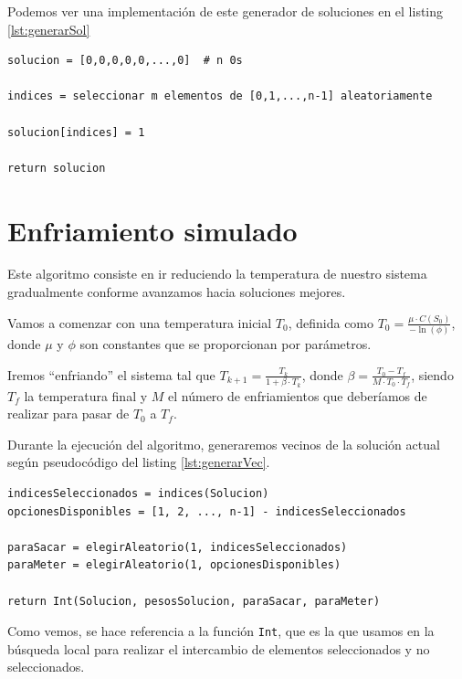 Podemos ver una implementación de este generador de soluciones en el listing \ref{lst:generarSol}

\begin{lstlisting}[frame=single, caption={Generador de soluciones}, captionpos=b, label=lst:generarSol]
solucion = [0,0,0,0,0,...,0]  # n 0s

indices = seleccionar m elementos de [0,1,...,n-1] aleatoriamente

solucion[indices] = 1

return solucion
\end{lstlisting}

\newpage

\section{Enfriamiento simulado}

Este algoritmo consiste en ir reduciendo la temperatura de nuestro sistema gradualmente conforme avanzamos hacia soluciones mejores.

Vamos a comenzar con una temperatura inicial $T_0$, definida como $\displaystyle T_0 = \frac{\mu \cdot C(S_0)}{-\ln(\phi)}$, donde $\mu$ y $\phi$ son constantes que se proporcionan por parámetros.

Iremos ``enfriando'' el sistema tal que $\displaystyle T_{k+1}= \frac{T_k}{1+ \beta \cdot T_k}$, donde $\displaystyle \beta = \frac{T_0 - T_f}{M\cdot T_0 \cdot T_f}$, siendo $T_f$ la temperatura final y $M$ el número de enfriamientos que deberíamos de realizar para pasar de $T_0$ a $T_f$.

Durante la ejecución del algoritmo, generaremos vecinos de la solución actual según pseudocódigo del listing \ref{lst:generarVec}.

\begin{lstlisting}[frame=single, caption={Generador de vecinos}, captionpos=b, label=lst:generarVec]
indicesSeleccionados = indices(Solucion)
opcionesDisponibles = [1, 2, ..., n-1] - indicesSeleccionados

paraSacar = elegirAleatorio(1, indicesSeleccionados)
paraMeter = elegirAleatorio(1, opcionesDisponibles)

return Int(Solucion, pesosSolucion, paraSacar, paraMeter)
\end{lstlisting}

Como vemos, se hace referencia a la función \texttt{Int}, que es la que usamos en la búsqueda local para realizar el intercambio de elementos seleccionados y no seleccionados.

